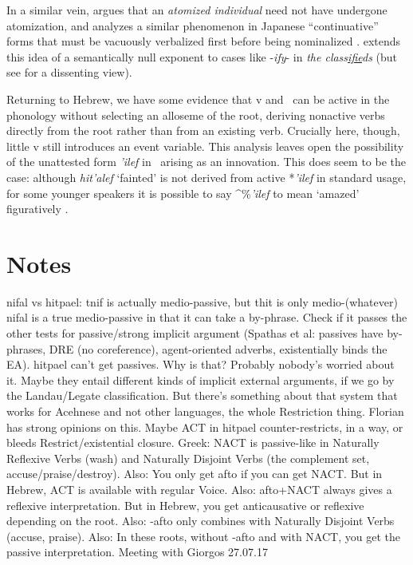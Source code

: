 In a similar vein, \cite{marantz13} argues that an \emph{atomized individual} need not have undergone atomization, and analyzes a similar phenomenon in Japanese ``continuative'' forms that must be vacuously verbalized first{ before being nominalized} \citep{volpe05}. \cite{anagnostopoulou14thli} extends this idea of a semantically null exponent to cases like -\emph{ify}- in \emph{the class\underline{ifie}ds} (but see \citealt{borer14lingua} for a dissenting view).

Returning to Hebrew, we have some evidence that v and \va~can be active in the phonology without selecting an alloseme of the root, deriving nonactive verbs directly from the root rather than from an existing verb. Crucially here, though, little v still introduces an event variable. This analysis leaves open the possibility of the unattested form \emph{'ilef} in \tpie~arising as an innovation. This does seem to be the case: although \emph{hit'alef} `fainted' is not derived from active *\emph{'ilef} in standard usage, for some younger speakers it is possible to say ^{\%}\emph{'ilef} to mean `amazed' figuratively \citep{laks14}.



\section{Notes}
nifal vs hitpael: tnif is actually medio-passive, but thit is only medio-(whatever)
	nifal is a true medio-passive in that it can take a by-phrase. Check if it passes the other tests for passive/strong implicit argument (Spathas et al: passives have by-phrases, DRE (no coreference), agent-oriented adverbs, existentially binds the EA).
	hitpael can't get passives. Why is that? Probably nobody's worried about it.
	Maybe they entail different kinds of implicit external arguments, if we go by the Landau/Legate classification.
	But there's something about that system that works for Acehnese and not other languages, the whole Restriction thing. Florian has strong opinions on this.
	Maybe ACT in hitpael counter-restricts, in a way, or bleeds Restrict/existential closure.
	Greek: NACT is passive-like in Naturally Reflexive Verbs (wash) and Naturally Disjoint Verbs (the complement set, accuse/praise/destroy).
		Also: You only get afto if you can get NACT. But in Hebrew, ACT is available with regular Voice.
		Also: afto+NACT always gives a reflexive interpretation. But in Hebrew, you get anticausative or reflexive depending on the root.
		Also: -afto only combines with Naturally Disjoint Verbs (accuse, praise).
		Also: In these roots, without -afto and with NACT, you get the passive interpretation.
	Meeting with Giorgos 27.07.17
